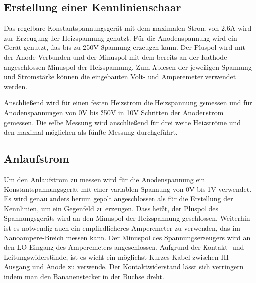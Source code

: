 \subsection{Erstellung einer Kennlinienschaar}
Das regelbare Konstantspannungsgerät mit dem maximalen Strom von 2,6A wird zur Erzeugung der Heizspannung genutzt. Für die Anodenspannung wird ein Gerät genutzt, das bis zu 250V Spannung erzeugen kann. Der Pluspol wird mit der Anode Verbunden und der Minuspol mit dem bereits an der Kathode angeschlossen Minuspol der Heizspannung. Zum Ablesen der jeweiligen Spannung und Stromstärke können die eingebauten Volt- und Amperemeter verwendet werden.

Anschließend wird für einen festen Heizstrom die Heizspannung gemessen und für Anodenspannungen von 0V bis 250V in 10V Schritten der Anodenstrom gemessen.
Die selbe Messung wird anschließend für drei weite Heizströme und den maximal möglichen als fünfte Messung durchgeführt.

\subsection{Anlaufstrom}
Um den Anlaufstrom zu messen wird für die Anodenspannung ein Konstantspannungsgerät mit einer variablen Spannung von 0V bis 1V verwendet. Es wird genau anders herum gepolt angeschlossen als für die Erstellung der Kennlinien, um ein Gegenfeld zu erzeugen. Dass heißt, der Pluspol des Spannungsgeräts wird an den Minuspol der Heizspannung geschlossen. Weiterhin ist es notwendig auch ein empfindlicheres Amperemeter zu verwenden, das im Nanoampere-Breich messen kann. Der Minuspol des Spannungserzeugers wird an den LO-Eingang des Amperemeters angeschlossen. Aufgrund der Kontakt- und Leitungswiderstände, ist es wicht ein möglichst Kurzes Kabel zwischen HI-Ausgang und Anode zu verwende. Der Kontaktwiderstand lässt sich verringern indem man den Bananenstecker in der Buchse dreht.